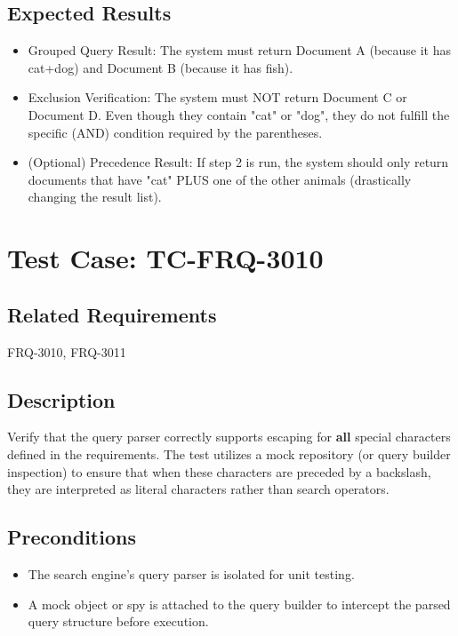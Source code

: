\documentclass{article}
\begin{document}
\subsection*{Expected Results}
\begin{itemize}
   \item Grouped Query Result: The system must return Document A (because it has cat+dog) and Document B (because it has fish). \item Exclusion Verification: The system must NOT return Document C or Document D. Even though they contain "cat" or "dog", they do not fulfill the specific (AND) condition required by the parentheses. \item (Optional) Precedence Result: If step 2 is run, the system should only return documents that have "cat" PLUS one of the other animals (drastically changing the result list).
 \end{itemize}

\section{Test Case: TC-FRQ-3010}

\subsection*{Related Requirements}
FRQ-3010, FRQ-3011

\subsection*{Description}
Verify that the query parser correctly supports escaping for \textbf{all} special characters defined in the requirements. 
The test utilizes a mock repository (or query builder inspection) 
to ensure that when these characters are preceded by a backslash, they are interpreted as literal characters rather than search operators.

\subsection*{Preconditions}
\begin{itemize}
    \item The search engine's query parser is isolated for unit testing.
    \item A mock object or spy is attached to the query builder to intercept the parsed query structure before execution.
\end{itemize}
\end{document}
